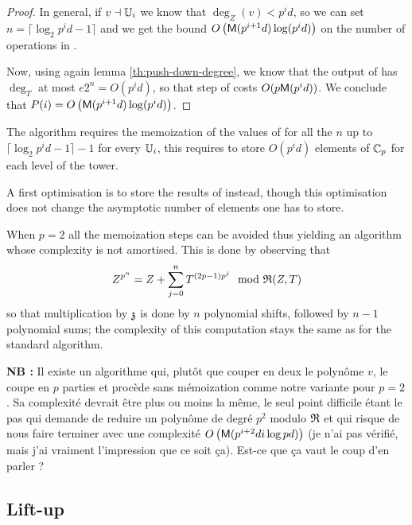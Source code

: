 \begin{proof}
  In general, if $v\dashv\mathbb{U}_i$ we know that $\deg_Z(v) < p^id$, so we
  can set $n = \lceil\log_2p^id-1\rceil$ and we get the bound
  $O\left(\mathrm{\sf M}(p^{i+1}d)\log (p^id)\right)$ on the number of operations
  in .

  Now, using again lemma \ref{th:push-down-degree}, we know that the
  output of  has $\deg_T$ at most $e2^n =
  O(p^id)$, so that step  of
   costs $O(p\mathrm{\sf M}(p^id))$. We conclude that $P(i) =
  O\left(\mathrm{\sf M}(p^{i+1}d)\log (p^id)\right)$.
\end{proof}

\begin{remark}
  The algorithm requires the memoization of the values of
   for all the $n$ up to
  $\lceil\log_2p^id - 1\rceil - 1$ for every $\mathbb{U}_i$, this requires to
  store $O(p^id)$ elements of $\mathbb{C}_p$ for each level of the tower.

  A first optimisation is to store the results of
   instead, though this optimisation does
  not change the asymptotic number of elements one has to store.

  When $p=2$ all the memoization steps can be avoided thus yielding an
  algorithm whose complexity is not amortised. This is done by
  observing that
  \[Z^{p^n} = Z + \sum_{j=0}^n T^{(2p-1)p^j} \mod \biv{R}(Z,T)\]
  so that multiplication by $\mathfrak{z}$ is done by $n$ polynomial
  shifts, followed by $n-1$ polynomial sums; the complexity of this
  computation stays the same as for the standard algorithm.
\end{remark}

\textbf{NB :} Il existe un algorithme qui, plutôt que couper en deux le
polynôme $v$, le coupe en $p$ parties et procède sans mémoization comme
notre variante pour $p=2$. Sa complexité devrait être plus ou moins la
même, le seul point difficile étant le pas 
qui demande de reduire un polynôme de degré $p^2$ modulo $\mathfrak{R}$ et
qui risque de nous faire terminer avec une complexité
$O\left(\mathrm{\sf M}(p^{i+2}di\log pd)\right)$ (je n'ai pas vérifié, mais
j'ai vraiment l'impression que ce soit ça). Est-ce que ça vaut le
coup d'en parler ?



\subsection{Lift-up}
\label{sec:level-embedding:lift-up}

